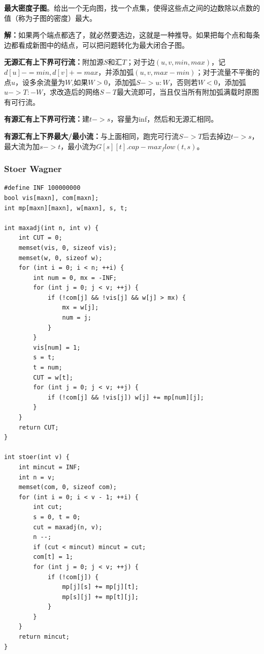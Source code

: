 \documentclass[twoside]{article}
\begin{document}
\indent

\textbf{最大密度子图}。给出一个无向图，找一个点集，使得这些点之间的边数除以点数的值（称为子图的密度）最大。

\indent

\textbf{解：}如果两个端点都选了，就必然要选边，这就是一种推导。如果把每个点和每条边都看成新图中的结点，可以把问题转化为最大闭合子图。

\indent

\textbf{无源汇有上下界可行流：}附加源$S$和汇$T$；对于边$(u, v, min, max)$，记$d[u]-=min, d[v]+=max$，并添加弧$(u, v, max - min)$；对于流量不平衡的点$u$，设多余流量为$W$,如果$W>0$，添加弧$S->u:W$，否则若$W<0$，添加弧$u->T:-W$，求改造后的网络$S-T$最大流即可，当且仅当所有附加弧满载时原图有可行流。

\indent

\textbf{有源汇有上下界可行流：}建$t->s$，容量为inf，然后和无源汇相同。

\indent

\textbf{有源汇有上下界最大/最小流：}与上面相同，跑完可行流$S->T$后去掉边$t->s$，最大流为加$s->t$，最小流为$G[s][t].cap-max_flow(t,s)$。

\subsubsection{Stoer Wagner}
\begin{lstlisting}
#define INF 100000000
bool vis[maxn], com[maxn];
int mp[maxn][maxn], w[maxn], s, t;

int maxadj(int n, int v) {
    int CUT = 0;
    memset(vis, 0, sizeof vis);
    memset(w, 0, sizeof w);
    for (int i = 0; i < n; ++i) {
        int num = 0, mx = -INF;
        for (int j = 0; j < v; ++j) {
            if (!com[j] && !vis[j] && w[j] > mx) {
                mx = w[j];
                num = j;
            }
        }
        vis[num] = 1;
        s = t;
        t = num;
        CUT = w[t];
        for (int j = 0; j < v; ++j) {
            if (!com[j] && !vis[j]) w[j] += mp[num][j];
        }
    }
    return CUT;
}

int stoer(int v) {
    int mincut = INF;
    int n = v;
    memset(com, 0, sizeof com);
    for (int i = 0; i < v - 1; ++i) {
        int cut;
        s = 0, t = 0;
        cut = maxadj(n, v);
        n --;
        if (cut < mincut) mincut = cut;
        com[t] = 1;
        for (int j = 0; j < v; ++j) {
            if (!com[j]) {
                mp[j][s] += mp[j][t];
                mp[s][j] += mp[t][j];
            }
        }
    }
    return mincut;
}\end{lstlisting}
\end{document}
